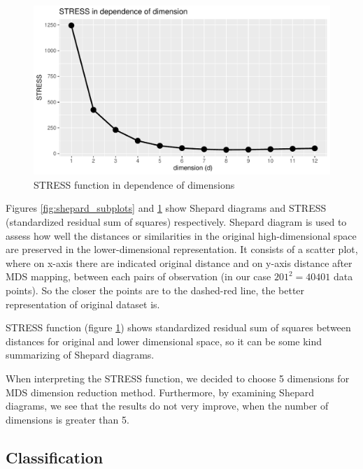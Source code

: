\documentclass[11pt,a4paper]{article}\usepackage[]{graphicx}\usepackage[]{xcolor}
\makeatletter
\def\maxwidth{ %
  \ifdim\Gin@nat@width>\linewidth
    \linewidth
  \else
    \Gin@nat@width
  \fi
}
\newenvironment{knitrout}{}{} %
\makeatother
\begin{document}
\begin{knitrout}
\color{fgcolor}\begin{figure}
\includegraphics[width=\maxwidth]{figure/stress-1} \caption[STRESS function in dependence of dimensions]{STRESS function in dependence of dimensions}\label{fig:stress}
\end{figure}

\end{knitrout}
	 
	 Figures \ref{fig:shepard_subplots} and \ref{fig:stress} show Shepard diagrams and STRESS (standardized residual sum of squares) respectively. Shepard diagram is used to assess how well the distances or similarities in the original high-dimensional space are preserved in the lower-dimensional representation. It consists of a scatter plot, where on x-axis there are indicated original distance and on y-axis distance after MDS mapping, between each pairs of observation (in our case $201^2=40401$ data points). So the closer the points are to the dashed-red line, the better representation of original dataset is.
	 
	 STRESS function (figure \ref{fig:stress}) shows standardized residual sum of squares between distances for original and lower dimensional space, so it can be some kind summarizing of Shepard diagrams.
	 
	 When interpreting the STRESS function, we decided to choose 5 dimensions for MDS dimension reduction method. Furthermore, by examining Shepard diagrams, we see that the results do not very improve, when the number of dimensions is greater than 5.
	 

	 
	 \subsection{Classification}
	 
\end{document}
